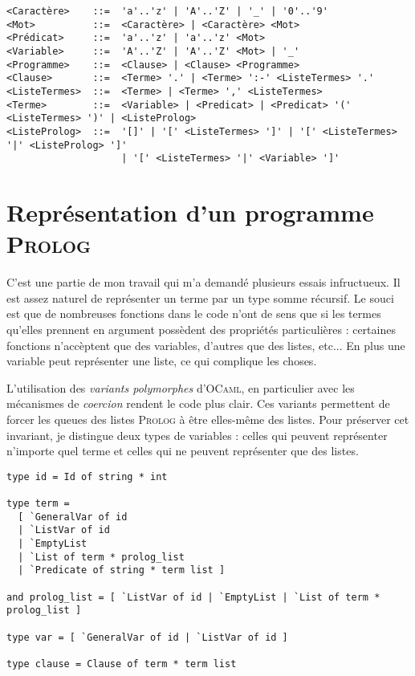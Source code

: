\documentclass{article}
\begin{document}
\begin{verbatim}
<Caractère>    ::=  'a'..'z' | 'A'..'Z' | '_' | '0'..'9'
<Mot>          ::=  <Caractère> | <Caractère> <Mot>
<Prédicat>     ::=  'a'..'z' | 'a'..'z' <Mot>
<Variable>     ::=  'A'..'Z' | 'A'..'Z' <Mot> | '_'
<Programme>    ::=  <Clause> | <Clause> <Programme>
<Clause>       ::=  <Terme> '.' | <Terme> ':-' <ListeTermes> '.'
<ListeTermes>  ::=  <Terme> | <Terme> ',' <ListeTermes>
<Terme>        ::=  <Variable> | <Predicat> | <Predicat> '(' <ListeTermes> ')' | <ListeProlog>
<ListeProlog>  ::=  '[]' | '[' <ListeTermes> ']' | '[' <ListeTermes> '|' <ListeProlog> ']' 
                    | '[' <ListeTermes> '|' <Variable> ']'
\end{verbatim}

\section{Représentation d'un programme \textsc{Prolog}}

C'est une partie de mon travail qui m'a demandé plusieurs essais infructueux. Il est assez naturel de représenter un terme par un type somme récursif. Le souci est que de nombreuses fonctions dans le code n'ont de sens que si les termes qu'elles prennent en argument possèdent des propriétés particulières : certaines fonctions n'accèptent que des variables, d'autres que des listes, etc... En plus une variable peut représenter une liste, ce qui complique les choses.

L'utilisation des \emph{variants polymorphes} d'\textsc{OCaml}, en particulier avec les mécanismes de \emph{coercion} rendent le code plus clair. Ces variants permettent de forcer les queues des listes \textsc{Prolog} à être elles-même des listes. Pour préserver cet invariant, je distingue deux types de variables : celles qui peuvent représenter n'importe quel terme et celles qui ne peuvent représenter que des listes.

\begin{verbatim}
type id = Id of string * int

type term =
  [ `GeneralVar of id
  | `ListVar of id
  | `EmptyList
  | `List of term * prolog_list
  | `Predicate of string * term list ]

and prolog_list = [ `ListVar of id | `EmptyList | `List of term * prolog_list ]

type var = [ `GeneralVar of id | `ListVar of id ]

type clause = Clause of term * term list
\end{verbatim}
\end{document}
